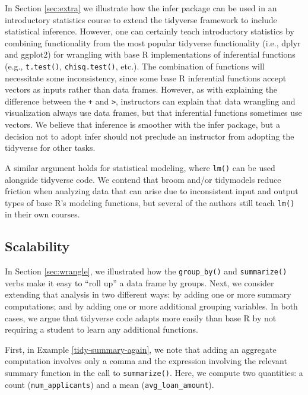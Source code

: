 \documentclass[12pt]{article}
\begin{document}
In Section \ref{sec:extra} we illustrate how the infer package can be
used in an introductory statistics course to extend the tidyverse
framework to include statistical inference. However, one can certainly
teach introductory statistics by combining functionality from the most
popular tidyverse functionality (i.e., dplyr and ggplot2) for wrangling
with base R implementations of inferential functions (e.g.,
\texttt{t.test()}, \texttt{chisq.test()}, etc.). The combination of
functions will necessitate some inconsistency, since some base R
inferential functions accept vectors as inputs rather than data frames.
However, as with explaining the difference between the \texttt{+} and
\texttt{\textbar{}\textgreater{}}, instructors can explain that data
wrangling and visualization always use data frames, but that inferential
functions sometimes use vectors. We believe that inference is smoother
with the infer package, but a decision not to adopt infer should not
preclude an instructor from adopting the tidyverse for other tasks.

A similar argument holds for statistical modeling, where \texttt{lm()}
can be used alongside tidyverse code. We contend that broom and/or
tidymodels reduce friction when analyzing data that can arise due to
inconsistent input and output types of base R's modeling functions, but
several of the authors still teach \texttt{lm()} in their own courses.

\hypertarget{sec:scalability}{%
\subsection{Scalability}\label{sec:scalability}}

In Section \ref{sec:wrangle}, we illustrated how the
\texttt{group\_by()} and \texttt{summarize()} verbs make it easy to
``roll up'' a data frame by groups. Next, we consider extending that
analysis in two different ways: by adding one or more summary
computations; and by adding one or more additional grouping variables.
In both cases, we argue that tidyverse code adapts more easily than base
R by not requiring a student to learn any additional functions.

First, in Example \ref{tidy-summary-again}, we note that adding an
aggregate computation involves only a comma and the expression involving
the relevant summary function in the call to \texttt{summarize()}. Here,
we compute two quantities: a count (\texttt{num\_applicants}) and a mean
(\texttt{avg\_loan\_amount}).
\end{document}
